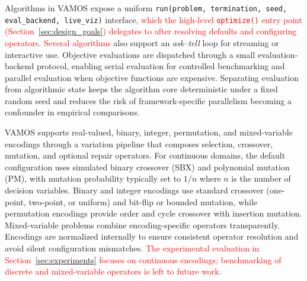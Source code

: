 \documentclass[journal]{IEEEtran}
\newcommand{\VAMOS}{VAMOS}
\begin{document}


Algorithms in \VAMOS{} expose a uniform \texttt{run(problem, termination, seed, eval\_backend, live\_viz)} interface\textcolor{red}{, which the high-level \texttt{optimize()} entry point (Section~\ref{sec:design_goals}) delegates to after resolving defaults and configuring operators}. \textcolor{red}{Several algorithms} also support an \emph{ask--tell} loop for streaming or interactive use. Objective evaluations are dispatched through a small evaluation-backend protocol, enabling serial evaluation for controlled benchmarking and parallel evaluation when objective functions are expensive. Separating evaluation from algorithmic state keeps the algorithm core deterministic under a fixed random seed and reduces the risk of framework-specific parallelism becoming a confounder in empirical comparisons.


\VAMOS{} supports real-valued, binary, integer, permutation, and mixed-variable encodings through a variation pipeline that composes selection, crossover, mutation, and optional repair operators. For continuous domains, the default configuration uses simulated binary crossover (SBX) and polynomial mutation (PM), with mutation probability typically set to $1/n$ where $n$ is the number of decision variables. Binary and integer encodings use standard crossover (one-point, two-point, or uniform) and bit-flip or bounded mutation, while permutation encodings provide order and cycle crossover with insertion mutation. Mixed-variable problems combine encoding-specific operators transparently. Encodings are normalized internally to ensure consistent operator resolution and avoid silent configuration mismatches. \textcolor{red}{The experimental evaluation in Section~\ref{sec:experiments} focuses on continuous encodings; benchmarking of discrete and mixed-variable operators is left to future work.}
\end{document}
